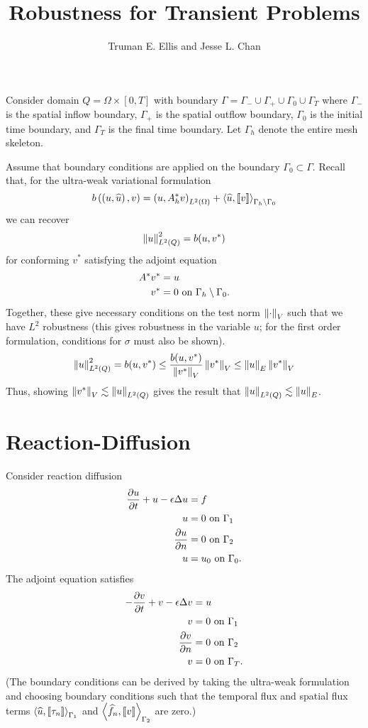 \documentclass{article}
\title{Robustness for Transient Problems}
\author{Truman E. Ellis and Jesse L. Chan}
\begin{document}
\maketitle

Consider domain $Q=\Omega\times[0,T]$ with boundary $\Gamma=\Gamma_-\cup\Gamma_+\cup\Gamma_0\cup\Gamma_T$ 
where $\Gamma_-$ is the spatial inflow boundary, $\Gamma_+$ is the spatial outflow boundary, $\Gamma_0$ is the initial time boundary, 
and $\Gamma_T$ is the final time boundary. Let $\Gamma_h$ denote the entire mesh skeleton.

Assume that boundary conditions are applied on the boundary $\Gamma_0\subset \Gamma$.  Recall that, for the ultra-weak variational formulation
\[
b\left( \left( u,\widehat{u} \right),v \right) = \left( u,A^*_h v \right)_{L^2\left( \Omega \right)} + \left\langle \widehat{u}, \left[ \![v]\! \right] \right\rangle_{\Gamma_h\setminus \Gamma_0}
\]
we can recover
\[
\left\| u \right\|_{L^2\left( Q \right)}^2 = b(u,v^*)
\]
for conforming $v^*$ satisfying the adjoint equation
\begin{align*}
A^* v^* &= u\\
v^* &= 0 \text{ on } \Gamma_h\setminus\Gamma_0.
\end{align*}
Together, these give necessary conditions on the test norm $\left\| \cdot \right\|_V$ such that we have $L^2$ robustness (this gives robustness in the variable $u$; for the first order formulation, conditions for $\sigma$ must also be shown).  
\[
\left\| u \right\|_{L^2\left( Q \right)}^2 = b(u,v^*) \leq \frac{b(u,v^*)}{\left\| v^* \right\|_V} \left\| v^* \right\|_V \leq \left\| u \right\|_E \left\| v^* \right\|_V
\]
Thus, showing $\left\| v^* \right\|_V \lesssim \left\| u \right\|_{L^2\left( Q \right)}$ gives the result that $\left\| u \right\|_{L^2\left( Q \right)} \lesssim \left\| u \right\|_E$.  


\section{Reaction-Diffusion}

Consider reaction diffusion
\begin{align*}
\frac{\partial u}{\partial t} + u - \epsilon \Delta u &= f\\
u &= 0 \text{ on } \Gamma_1\\
\frac{\partial u}{\partial n} &= 0 \text{ on } \Gamma_2\\
u &= u_0 \text{ on } \Gamma_0.
\end{align*}
The adjoint equation satisfies
\begin{align*}
-\frac{\partial v}{\partial t} + v - \epsilon \Delta v &= u\\
v &= 0 \text{ on } \Gamma_1\\
\frac{\partial v}{\partial n} &= 0 \text{ on } \Gamma_2\\
v &= 0 \text{ on } \Gamma_T.
\end{align*}
(The boundary conditions can be derived by taking the ultra-weak formulation and choosing boundary conditions such that the temporal flux and spatial flux terms $\left\langle \widehat{u}, \left[ \![\tau_n]\! \right] \right\rangle_{\Gamma_1}$ and $\left\langle \widehat{f}_n,\left[ \![v]\! \right] \right\rangle_{\Gamma_2}$ are zero.)
\end{document}
